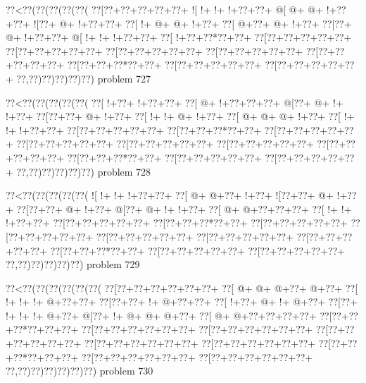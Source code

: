 \vbox{\vbox{\goo
\0??<\0??(\0??(\0??(\0??(\0??(
\0??[\0??+\0??+\0??+\0??+\0??+
\- ![\- !+\- !+\- !+\0??+\0??+
\- @[\- @+\- @+\- !+\0??+\0??+
\- ![\0??+\- @+\- !+\0??+\0??+
\0??[\- !+\- @+\- @+\- !+\0??+
\0??[\- @+\0??+\- @+\- !+\0??+
\0??[\0??+\- @+\- !+\0??+\0??+
\- @[\- !+\- !+\- !+\0??+\0??+
\0??[\- !+\0??+\0??*\0??+\0??+
\0??[\0??+\0??+\0??+\0??+\0??+
\0??[\0??+\0??+\0??+\0??+\0??+
\0??[\0??+\0??+\0??+\0??+\0??+
\0??[\0??+\0??+\0??+\0??+\0??+
\0??[\0??+\0??+\0??+\0??+\0??+
\0??[\0??+\0??+\0??*\0??+\0??+
\0??[\0??+\0??+\0??+\0??+\0??+
\0??[\0??+\0??+\0??+\0??+\0??+
\0??,\0??)\0??)\0??)\0??)\0??)
}
\hfil problem 727\hfil\break
}

\vbox{\vbox{\goo
\0??<\0??(\0??(\0??(\0??(\0??(
\0??[\- !+\0??+\- !+\0??+\0??+
\0??[\- @+\- !+\0??+\0??+\0??+
\- @[\0??+\- @+\- !+\- !+\0??+
\0??[\0??+\0??+\- @+\- !+\0??+
\0??[\- !+\- !+\- @+\- !+\0??+
\0??[\- @+\- @+\- @+\- !+\0??+
\0??[\- !+\- !+\- !+\0??+\0??+
\0??[\0??+\0??+\0??+\0??+\0??+
\0??[\0??+\0??+\0??*\0??+\0??+
\0??[\0??+\0??+\0??+\0??+\0??+
\0??[\0??+\0??+\0??+\0??+\0??+
\0??[\0??+\0??+\0??+\0??+\0??+
\0??[\0??+\0??+\0??+\0??+\0??+
\0??[\0??+\0??+\0??+\0??+\0??+
\0??[\0??+\0??+\0??*\0??+\0??+
\0??[\0??+\0??+\0??+\0??+\0??+
\0??[\0??+\0??+\0??+\0??+\0??+
\0??,\0??)\0??)\0??)\0??)\0??)
}
\hfil problem 728\hfil\break
}

\vbox{\vbox{\goo
\0??<\0??(\0??(\0??(\0??(\0??(
\- ![\- !+\- !+\- !+\0??+\0??+
\0??[\- @+\- @+\0??+\- !+\0??+
\- ![\0??+\0??+\- @+\- !+\0??+
\0??[\0??+\0??+\- @+\- !+\0??+
\- @[\0??+\- @+\- !+\- !+\0??+
\0??[\- @+\- @+\0??+\0??+\0??+
\0??[\- !+\- !+\- !+\0??+\0??+
\0??[\0??+\0??+\0??+\0??+\0??+
\0??[\0??+\0??+\0??*\0??+\0??+
\0??[\0??+\0??+\0??+\0??+\0??+
\0??[\0??+\0??+\0??+\0??+\0??+
\0??[\0??+\0??+\0??+\0??+\0??+
\0??[\0??+\0??+\0??+\0??+\0??+
\0??[\0??+\0??+\0??+\0??+\0??+
\0??[\0??+\0??+\0??*\0??+\0??+
\0??[\0??+\0??+\0??+\0??+\0??+
\0??[\0??+\0??+\0??+\0??+\0??+
\0??,\0??)\0??)\0??)\0??)\0??)
}
\hfil problem 729\hfil\break
}

\vbox{\vbox{\goo
\0??<\0??(\0??(\0??(\0??(\0??(\0??(
\0??[\0??+\0??+\0??+\0??+\0??+\0??+
\0??[\- @+\- @+\- @+\0??+\- @+\0??+
\0??[\- !+\- !+\- !+\- @+\0??+\0??+
\0??[\0??+\0??+\- !+\- @+\0??+\0??+
\0??[\- !+\0??+\- @+\- !+\- @+\0??+
\0??[\0??+\- !+\- !+\- !+\- @+\0??+
\- @[\0??+\- !+\- @+\- @+\- @+\0??+
\0??[\- @+\- @+\0??+\0??+\0??+\0??+
\0??[\0??+\0??+\0??*\0??+\0??+\0??+
\0??[\0??+\0??+\0??+\0??+\0??+\0??+
\0??[\0??+\0??+\0??+\0??+\0??+\0??+
\0??[\0??+\0??+\0??+\0??+\0??+\0??+
\0??[\0??+\0??+\0??+\0??+\0??+\0??+
\0??[\0??+\0??+\0??+\0??+\0??+\0??+
\0??[\0??+\0??+\0??*\0??+\0??+\0??+
\0??[\0??+\0??+\0??+\0??+\0??+\0??+
\0??[\0??+\0??+\0??+\0??+\0??+\0??+
\0??,\0??)\0??)\0??)\0??)\0??)\0??)
}
\hfil problem 730\hfil\break
}

